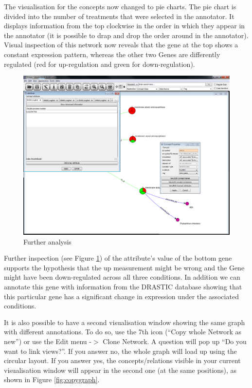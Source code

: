 The visualisation for the concepts now changed to pie charts. 
The pie chart is divided into the number of treatments that were selected in the annotator. 
It displays information from the top clockwise in the order in which they appear in the annotator
(it is possible to drap and drop the order around in the annotator). 
Visual inspection of this network now reveals that the gene at the top shows a constant expression pattern, 
whereas the other two Genes are differently regulated (red for up-regulation and green for down-regulation).

\begin{figure}[H]
\centering
\includegraphics[scale=0.35]{images/Oct12/app1fig11.png} 
\caption{Further analysis}
\label{fig:further}
\end{figure}

Further inspection (see Figure \ref{fig:further}) of the attribute's value of the bottom gene supports the hypothesis 
that the up measurement might be wrong and the Gene might have been down-regulated across all three conditions. 
In addition we can annotate this gene with information from the DRASTIC database showing that 
this particular gene has a significant change in expression under the associated conditions. 

It is also possible to have a second visualisation window showing the same graph with different annotations.
To do so, use the 7th icon (``Copy whole Network as new'') or use the Edit menu -$>$ Clone Network.
A question will pop up ``Do you want to link views?''. 
If you answer no, the whole graph will load up using the circular layout.
If you answer yes, the concepts/relations visible in your current visualisation window will appear in the second one (at the same positions),
as shown in Figure \ref{fig:copygraph}.

